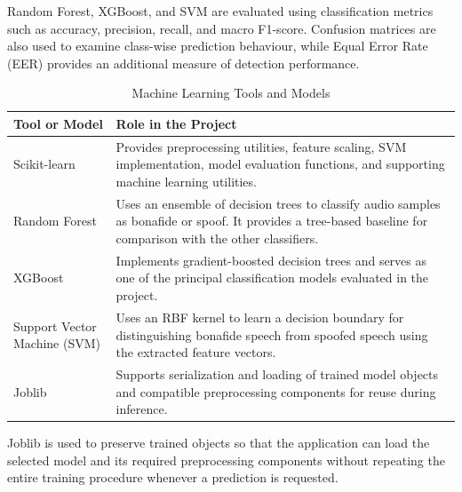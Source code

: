 \documentclass[12pt,a4paper]{report}
\begin{document}
Random Forest, XGBoost, and SVM are evaluated using classification metrics such as accuracy, precision, recall, and macro F1-score. Confusion matrices are also used to examine class-wise prediction behaviour, while Equal Error Rate (EER) provides an additional measure of detection performance.
\begin{table}[H]
\centering
\small
\renewcommand{\arraystretch}{1.35}

\begin{tabularx}{\textwidth}{
    >{\raggedright\arraybackslash}p{}
    >{\raggedright\arraybackslash}X
}
\toprule
\textbf{Tool or Model} & \textbf{Role in the Project} \\
\midrule

Scikit-learn &
Provides preprocessing utilities, feature scaling, SVM implementation, model evaluation functions, and supporting machine learning utilities. \\

Random Forest &
Uses an ensemble of decision trees to classify audio samples as bonafide or spoof. It provides a tree-based baseline for comparison with the other classifiers. \\

XGBoost &
Implements gradient-boosted decision trees and serves as one of the principal classification models evaluated in the project. \\

Support Vector Machine (SVM) &
Uses an RBF kernel to learn a decision boundary for distinguishing bonafide speech from spoofed speech using the extracted feature vectors. \\

Joblib &
Supports serialization and loading of trained model objects and compatible preprocessing components for reuse during inference. \\

\bottomrule
\end{tabularx}

\caption{Machine Learning Tools and Models}
\label{tab:ml-environment}
\end{table}


Joblib is used to preserve trained objects so that the application can load the selected model and its required preprocessing components without repeating the entire training procedure whenever a prediction is requested.

\end{document}
